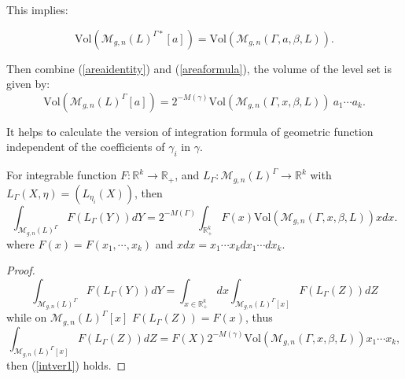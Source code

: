 This implies:
\begin{lemma}
\begin{equation}\label{areaidentity}
    \mathrm{Vol}(\mathscr{M}_{g,n}(L)^{\Gamma*}[a])=\mathrm{Vol}(\mathscr{M}_{g,n}(\Gamma,a,\beta,L)).
\end{equation}


\end{lemma}

Then combine (\ref{areaidentity}) and (\ref{areaformula}), the volume of the level set  is given by:
\begin{equation}
    \mathrm{Vol}(\mathscr{M}_{g,n}(L)^\Gamma[a])=2^{-M(\gamma)}\mathrm{Vol}(\mathscr{M}_{g,n}(\Gamma,x,\beta,L))\ a_1\cdots a_k.
\end{equation}

It helps to calculate the version of integration formula of geometric function independent of the coefficients of $\gamma_i$ in $\gamma$.

\begin{theorem}
For integrable function $F\colon\mathbb{R}^k\to \mathbb{R}_+$, and $L_\Gamma\colon\mathscr{M}_{g,n}(L)^\Gamma\to \mathbb{R}^k$ with  $L_\Gamma(X,\eta)=(L_{\eta_i}(X))$, then 
\begin{equation}\label{intver1}
    \int_{\mathscr{M}_{g,n}(L)^\Gamma}F(L_\Gamma(Y))dY=2^{-M(\Gamma)}\int_{\mathbb{R}_+^k}F(x)\mathrm{Vol}(\mathscr{M}_{g,n}(\Gamma,x,\beta,L))xdx.
\end{equation}
where $F(x)=F(x_1,\cdots,x_k)$ and $xdx=x_1\cdots x_kdx_1\cdots dx_k$.
\end{theorem}

\begin{proof}
$$
\int_{\mathscr{M}_{g,n}(L)^\Gamma}F(L_\Gamma(Y))dY
=\int_{x\in\mathbb{R}_+^k} dx \int_{\mathscr{M}_{g,n}(L)^\Gamma[x]}F(L_\Gamma(Z))dZ
$$
while on $\mathscr{M}_{g,n}(L)^\Gamma[x]$ $F(L_\Gamma(Z))=F(x)$,  thus $$
\int_{\mathscr{M}_{g,n}(L)^\Gamma[x]}F(L_\Gamma(Z))dZ
=F(X)2^{-M(\gamma)}\mathrm{Vol}(\mathscr{M}_{g,n}(\Gamma,x,\beta,L))x_1\cdots x_k,
$$
then (\ref{intver1}) holds.
\end{proof}

